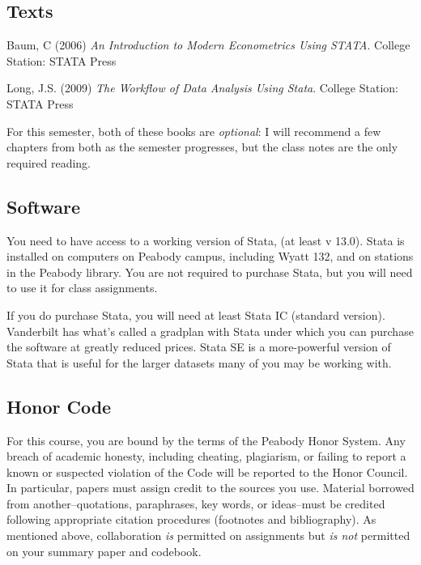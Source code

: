\documentclass[12pt]{article}
\begin{document}
\subsection{Texts}%

\begin{flushleft}

Baum, C (2006) \textit{An Introduction to Modern Econometrics Using
STATA}. College Station: STATA Press

Long, J.S. (2009) \textit{The Workflow of Data Analysis Using Stata}. College Station: STATA Press

For this semester, both of these books are \textit{optional}: I will
recommend a few chapters from both as the semester progresses, but the
class notes are the only required reading. 

\end{flushleft}

\subsection{Software}

You need to have access to a working version of Stata, (at least v
13.0).  Stata is installed on computers on Peabody campus, including
Wyatt 132, and on stations in the Peabody library. You are not
required to purchase Stata, but you will need to use it for class
assignments.

If you do purchase Stata, you will need at least Stata IC (standard
version). Vanderbilt has what's called a gradplan with Stata under
which you can purchase the software at greatly reduced prices.  Stata
SE is a more-powerful version of Stata that is useful for the larger
datasets many of you may be working with.


\subsection{Honor Code}
\label{sec:honor-code}

For this course, you are bound by the terms of the Peabody Honor
System. Any breach of academic honesty, including cheating,
plagiarism, or failing to report a known or suspected violation of the
Code will be reported to the Honor Council. In particular, papers must
assign credit to the sources you use. Material borrowed from
another--quotations, paraphrases, key words, or ideas--must be
credited following appropriate citation procedures (footnotes and
bibliography). As mentioned above, collaboration \textit{is} permitted
on assignments but \textit{is not} permitted on your summary paper and
codebook. 
 
\end{document}
